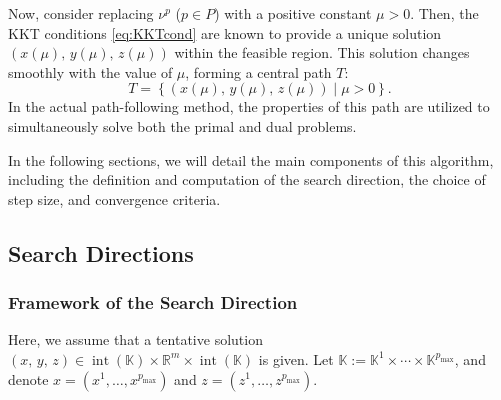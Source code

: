 \medskip

Now, consider replacing $\nu^p$ ($p \in P$) with a positive constant $\mu > 0$. Then, the KKT conditions \eqref{eq:KKTcond} are known to provide a unique solution $\left( x(\mu),\, y(\mu),\, z(\mu) \right)$ within the feasible region. This solution changes smoothly with the value of $\mu$, forming a central path $T$:
\[
  T = \left\{ \left( x(\mu),\, y(\mu),\, z(\mu) \right) \mid \mu > 0 \right\}.
\]
In the actual path-following method, the properties of this path are utilized to simultaneously solve both the primal and dual problems.

\medskip

In the following sections, we will detail the main components of this algorithm, including the definition and computation of the search direction, the choice of step size, and convergence criteria.



\bigskip
\subsection{Search Directions} \label{sec:direction}

\subsubsection{Framework of the Search Direction}

Here, we assume that a tentative solution $(x,\,y,\,z) \in \operatorname{int}(\mathbb{K}) \times \mathbb{R}^m \times \operatorname{int}(\mathbb{K})$ is given.
Let $\mathbb{K} := \mathbb{K}^1 \times \cdots \times \mathbb{K}^{p_{\max}}$, and denote $x = (x^1, \ldots, x^{p_{\max}})$ and $z = (z^1, \ldots, z^{p_{\max}})$.


